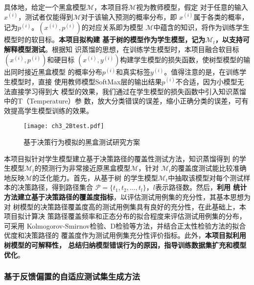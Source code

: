 具体地，给定一个黑盒模型$\mathcal M$，本项目将$\mathcal M$视为教师模型，假定
对于任意的输入$x^{(i)}$，测试者仅能得到$\mathcal M$对于该输入预测的概率分布，即
$x^{(i)}$属于各类的概率，记为$p^{(i)}$。$(x^{(i)}, p^{(i)})$的对应关系即为模型
$\mathcal M$中蕴含的知识，将作为训练学生模型时的软目标。\textbf{本项目拟构建
    基于树的模型作为学生模型，记为$\mathcal M_t$，以支持可解释模型测试}。根据知
识蒸馏的思想，在训练学生模型时，本项目融合软目标$(x^{(i)}, p^{(i)})$和硬目标
$(x^{(i)}, y^{(i)})$构建学生模型的损失函数，使树型模型的输出同时接近黑盒模型
的概率分布$p^{(i)}$和真实标签$y^{(i)}$。值得注意的是，在训练学生模型时，直接
使用教师模型SoftMax层的输出结果$p^{(i)}$不合适，因为小模型无法直接学习得到大
模型的效果，我们通过在学生模型的损失函数中引入知识蒸馏中的T（Temperature）参
数，放大分类错误的误差，缩小正确分类的误差，可有效提高学生模型训练的效果。

\begin{figure}[htp]
    \begin{small}
        \begin{center}
            \texttt{[image: ch3\_2Btest.pdf]}
        \end{center}
        \caption{基于决策行为模拟的黑盒测试研究方案}
        \label{fig:ch3:2Btest}
    \end{small}
\end{figure}


{本项目拟针对学生模型建立基于决策路径的覆盖性测试方法}，知识蒸馏得到
的学生模型$\mathcal M_t$的预测行为非常接近原黑盒模型$\mathcal M$，针对
$\mathcal M_t$的覆盖度测试能比较准确地反映$\mathcal M$的泛化能力。首先，从基于树
的学生模型$\mathcal M_t$中抽取该模型对每个测试样本的决策路径，得到路径集合
$\mathcal P=\{t_1, t_2,\dots, t_l\}$，$l$表示路径数。然后，\textbf{利用
    统计方法建立基于决策路径的覆盖度指标}，以评估测试用例集的充分性，其基本思想为对
树模型的决策路径覆盖度高的测试用例集具有良好的充分性，在此基础上，本项目拟计算决
策路径覆盖频率和正态分布的拟合程度来评估测试用例集的分布，可采用
Kolmogorov-Smirnov检验、D检验等方法，并结合正太性检验方法的拟合优度和决策路径的
覆盖度作为测试用例集充分性评价指标。此外，\textbf{本项目拟利用树模型的可解释性，
    总结归纳模型错误行为的原因，指导训练数据集扩充和模型优化}。



\subsubsection{基于反馈偏置的自适应测试集生成方法}\label{ch3_3}

